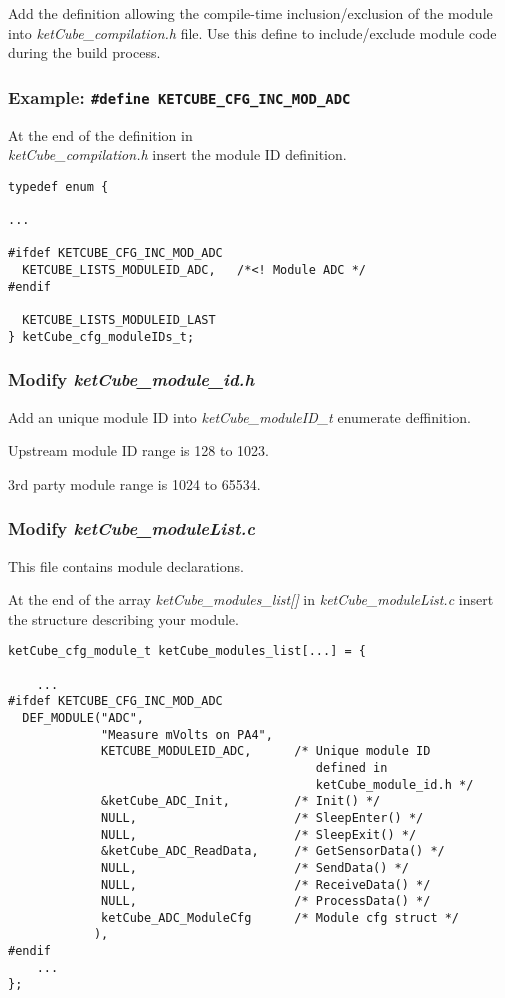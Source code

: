 Add the definition allowing the compile-time inclusion/exclusion of the module into {\it ketCube\_compilation.h} file.
Use this define to include/exclude module code during the build process.
\subsubsection*{Example: {\tt \#define KETCUBE\_CFG\_INC\_MOD\_ADC}}

At the end of the definition in\\{\it ketCube\_compilation.h} insert the module ID definition.

\begin{docCodeExample}
\begin{verbatim}
typedef enum {

...

#ifdef KETCUBE_CFG_INC_MOD_ADC
  KETCUBE_LISTS_MODULEID_ADC,   /*<! Module ADC */
#endif

  KETCUBE_LISTS_MODULEID_LAST
} ketCube_cfg_moduleIDs_t;
\end{verbatim}
\end{docCodeExample}

\subsubsection*{Modify {\it ketCube\_module\_id.h}}
Add an unique module ID into {\it ketCube\_moduleID\_t} enumerate deffinition.  

Upstream module ID range is 128 to 1023.

3rd party module range is 1024 to 65534.

\subsubsection*{Modify {\it ketCube\_moduleList.c}}

This file contains module declarations.

At the end of the array {\it ketCube\_modules\_list[]} in {\it ketCube\_moduleList.c} insert the structure describing your module.

\begin{docCodeExample}
\begin{verbatim}
ketCube_cfg_module_t ketCube_modules_list[...] = {
    
    ...
#ifdef KETCUBE_CFG_INC_MOD_ADC
  DEF_MODULE("ADC",
             "Measure mVolts on PA4",
             KETCUBE_MODULEID_ADC,      /* Unique module ID 
                                           defined in 
                                           ketCube_module_id.h */
             &ketCube_ADC_Init,         /* Init() */
             NULL,                      /* SleepEnter() */
             NULL,                      /* SleepExit() */
             &ketCube_ADC_ReadData,     /* GetSensorData() */
             NULL,                      /* SendData() */
             NULL,                      /* ReceiveData() */
             NULL,                      /* ProcessData() */
             ketCube_ADC_ModuleCfg      /* Module cfg struct */
            ),
#endif
    ...
};
\end{verbatim}
\end{docCodeExample}

